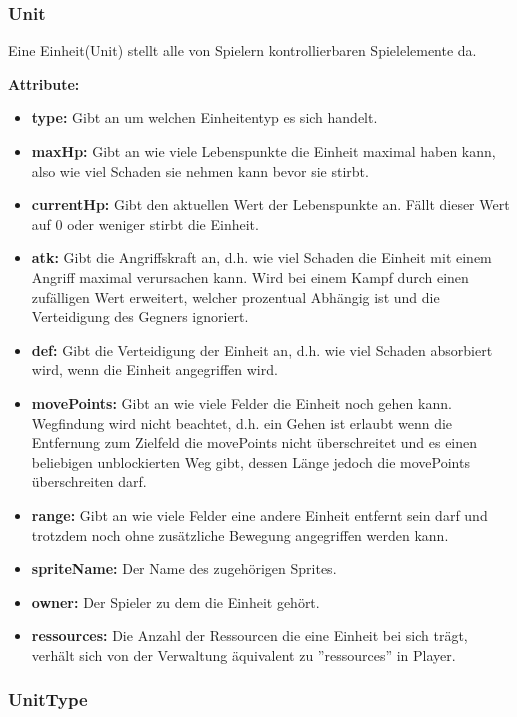 \documentclass[fontsize=12pt,paper=a4,twoside]{scrartcl}
\begin{document}
\subsubsection{Unit}

Eine Einheit(Unit) stellt alle von Spielern kontrollierbaren Spielelemente da.

\textbf{Attribute:}
\begin{itemize}
\item \textbf{type:} Gibt an um welchen Einheitentyp es sich handelt.
\item \textbf{maxHp:} Gibt an wie viele Lebenspunkte die Einheit maximal haben kann, also wie viel Schaden sie nehmen kann bevor sie stirbt.
\item \textbf{currentHp:} Gibt den aktuellen Wert der Lebenspunkte an. Fällt dieser Wert auf 0 oder weniger stirbt die Einheit.
\item \textbf{atk:} Gibt die Angriffskraft an, d.h. wie viel Schaden die Einheit mit einem Angriff maximal verursachen kann. Wird bei einem Kampf durch einen zufälligen Wert erweitert, welcher prozentual Abhängig ist und die Verteidigung des Gegners ignoriert.
\item \textbf{def:} Gibt die Verteidigung der Einheit an, d.h. wie viel Schaden absorbiert wird, wenn die Einheit angegriffen wird.
\item \textbf{movePoints:} Gibt an wie viele Felder die Einheit noch gehen kann. Wegfindung wird nicht beachtet, d.h. ein Gehen ist erlaubt wenn die Entfernung zum Zielfeld die movePoints nicht überschreitet und es einen beliebigen unblockierten Weg gibt, dessen Länge jedoch die movePoints überschreiten darf.
\item \textbf{range:} Gibt an wie viele Felder eine andere Einheit entfernt sein darf und trotzdem noch ohne zusätzliche Bewegung angegriffen werden kann.
\item \textbf{spriteName:} Der Name des zugehörigen Sprites.
\item \textbf{owner:} Der Spieler zu dem die Einheit gehört.
\item \textbf{ressources:} Die Anzahl der Ressourcen die eine Einheit bei sich trägt, verhält sich von der Verwaltung äquivalent zu ''ressources'' in Player.
\end{itemize}


\subsubsection{UnitType}
\end{document}
